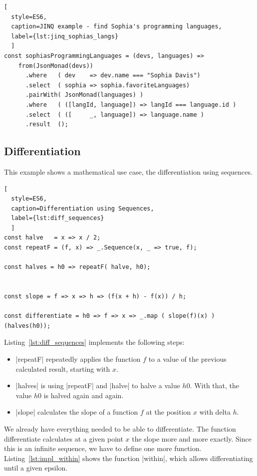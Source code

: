 \begin{lstlisting}[
  style=ES6, 
  caption=JINQ example - find Sophia's programming languages,
  label={lst:jinq_sophias_langs}
  ]
const sophiasProgrammingLanguages = (devs, languages) =>
    from(JsonMonad(devs))
      .where   ( dev    => dev.name === "Sophia Davis")
      .select  ( sophia => sophia.favoriteLanguages)
      .pairWith( JsonMonad(languages) )
      .where   ( ([langId, language]) => langId === language.id )
      .select  ( ([     _, language]) => language.name )
      .result  ();
\end{lstlisting}

\subsection{Differentiation}
\label{sub:Differentiation}
This example shows a mathematical use case, the differentiation using sequences.

\begin{lstlisting}[
  style=ES6, 
  caption=Differentiation using Sequences,
  label={lst:diff_sequences}
  ]
const halve   = x => x / 2;
const repeatF = (f, x) => _.Sequence(x, _ => true, f);

const halves = h0 => repeatF( halve, h0);


const slope = f => x => h => (f(x + h) - f(x)) / h;

const differentiate = h0 => f => x => _.map ( slope(f)(x) ) (halves(h0));
\end{lstlisting}

Listing~\ref{lst:diff_sequences} implements the following steps: 


\begin{itemize}
  \item{|repeatF| repeatedly applies the function $f$ to a value of the
    previous calculated result, starting with $x$.}
  \item{ |halves| is using |repeatF| and |halve| to halve a value $h0$. With
      that, the value $h0$ is halved again and again.} 
    \item{|slope| calculates the slope of a function $f$ at the position $x$
      with delta $h$.}
 \end{itemize}

We already have everything needed to be able to differentiate.  The function
differentiate calculates at a given point $x$ the slope more and more exactly.
Since this is an infinite sequence, we have to define one more function.
Listing~\ref{lst:impl_within} shows the function |within|, which allows differentiating until a
given epsilon.

